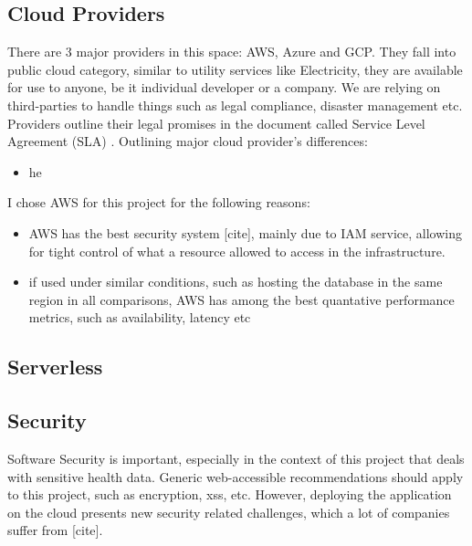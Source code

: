 \subsection{Cloud Providers}
There are 3 major providers in this space: AWS, Azure and GCP. They fall into public cloud category, similar to utility services like Electricity, they are available for use to anyone, be it individual developer or a company. We are relying on third-parties to handle things such as legal compliance, disaster management etc. Providers outline their legal promises in the document called Service Level Agreement (SLA) \cite{cloudSLA}. Outlining major cloud provider's differences:
\begin{itemize}
    \item {he}
\end{itemize}

I chose AWS for this project for the following reasons:
\begin{itemize}
    \item{AWS has the best security system [cite], mainly due to IAM service, allowing for tight control of what a resource allowed to access in the infrastructure. }
    \item{if used under similar conditions, such as hosting the database in the same region in all comparisons, AWS has among the best quantative performance metrics, such as availability, latency etc \cite{CloudMetrics}  }
\end{itemize}
\subsection{Serverless}
\subsection{Security}
Software Security is important, especially in the context of this project that deals with sensitive health data. Generic web-accessible recommendations should apply to this project, such as encryption, xss, etc. However, deploying the application on the cloud presents new security related challenges, which a lot of companies suffer from [cite]. 
